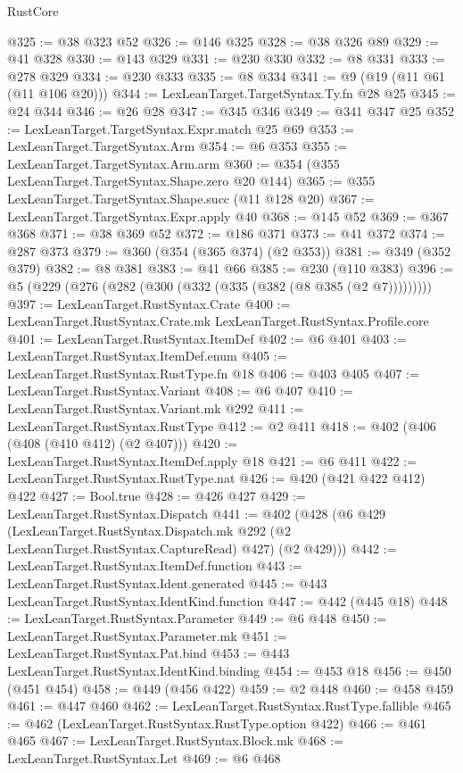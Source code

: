 \begin{lexlean}{RustCore}
\begin{coremodule}
@325 := @38 @323 @52
@326 := @146 @325
@328 := @38 @326 @89
@329 := @41 @328
@330 := @143 @329
@331 := @230 @330
@332 := @8 @331
@333 := @278 @329
@334 := @230 @333
@335 := @8 @334
@341 := @9 (@19 (@11 @61 (@11 @106 @20)))
@344 := LexLeanTarget.TargetSyntax.Ty.fn @28 @25
@345 := @24 @344
@346 := @26 @28
@347 := @345 @346
@349 := @341 @347 @25
@352 := LexLeanTarget.TargetSyntax.Expr.match @25 @69
@353 := LexLeanTarget.TargetSyntax.Arm
@354 := @6 @353
@355 := LexLeanTarget.TargetSyntax.Arm.arm
@360 := @354 (@355 LexLeanTarget.TargetSyntax.Shape.zero @20 @144)
@365 := @355 LexLeanTarget.TargetSyntax.Shape.succ (@11 @128 @20)
@367 := LexLeanTarget.TargetSyntax.Expr.apply @40
@368 := @145 @52
@369 := @367 @368
@371 := @38 @369 @52
@372 := @186 @371
@373 := @41 @372
@374 := @287 @373
@379 := @360 (@354 (@365 @374) (@2 @353))
@381 := @349 (@352 @379)
@382 := @8 @381
@383 := @41 @66
@385 := @230 (@110 @383)
@396 := @5 (@229 (@276 (@282 (@300 (@332 (@335 (@382 (@8 @385 (@2 @7)))))))))
@397 := LexLeanTarget.RustSyntax.Crate
@400 := LexLeanTarget.RustSyntax.Crate.mk LexLeanTarget.RustSyntax.Profile.core
@401 := LexLeanTarget.RustSyntax.ItemDef
@402 := @6 @401
@403 := LexLeanTarget.RustSyntax.ItemDef.enum
@405 := LexLeanTarget.RustSyntax.RustType.fn @18
@406 := @403 @405
@407 := LexLeanTarget.RustSyntax.Variant
@408 := @6 @407
@410 := LexLeanTarget.RustSyntax.Variant.mk @292
@411 := LexLeanTarget.RustSyntax.RustType
@412 := @2 @411
@418 := @402 (@406 (@408 (@410 @412) (@2 @407)))
@420 := LexLeanTarget.RustSyntax.ItemDef.apply @18
@421 := @6 @411
@422 := LexLeanTarget.RustSyntax.RustType.nat
@426 := @420 (@421 @422 @412) @422
@427 := Bool.true
@428 := @426 @427
@429 := LexLeanTarget.RustSyntax.Dispatch
@441 := @402
    (@428
      (@6
        @429
        (LexLeanTarget.RustSyntax.Dispatch.mk @292 (@2 LexLeanTarget.RustSyntax.CaptureRead) @427)
        (@2 @429)))
@442 := LexLeanTarget.RustSyntax.ItemDef.function
@443 := LexLeanTarget.RustSyntax.Ident.generated
@445 := @443 LexLeanTarget.RustSyntax.IdentKind.function
@447 := @442 (@445 @18)
@448 := LexLeanTarget.RustSyntax.Parameter
@449 := @6 @448
@450 := LexLeanTarget.RustSyntax.Parameter.mk
@451 := LexLeanTarget.RustSyntax.Pat.bind
@453 := @443 LexLeanTarget.RustSyntax.IdentKind.binding
@454 := @453 @18
@456 := @450 (@451 @454)
@458 := @449 (@456 @422)
@459 := @2 @448
@460 := @458 @459
@461 := @447 @460
@462 := LexLeanTarget.RustSyntax.RustType.fallible
@465 := @462 (LexLeanTarget.RustSyntax.RustType.option @422)
@466 := @461 @465
@467 := LexLeanTarget.RustSyntax.Block.mk
@468 := LexLeanTarget.RustSyntax.Let
@469 := @6 @468

\end{coremodule}
\end{lexlean}
